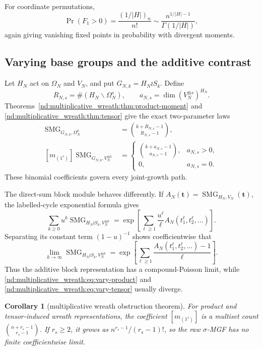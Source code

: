 \documentclass[10pt]{article}
\newcommand{\SMG}{\operatorname{SMG}}
\newcommand{\MGF}{\SMG}
\newtheorem{corollary}{Corollary}
\begin{document}
For coordinate permutations,
\[
 \Pr(F_1>0)=\frac{(1/|H|)_n}{n!}
 \sim\frac{n^{1/|H|-1}}{\Gamma(1/|H|)},
\]
again giving vanishing fixed points in probability with divergent moments.

\subsection{Varying base groups and the additive contrast}

Let $H_N$ act on $\Omega_N$ and $V_N$, and put
$G_{N,k}=H_N\wr S_k$.  Define
\[
 R_{N,s}=\#(H_N\backslash\Omega_N^s),
 \qquad a_{N,s}=\dim(V_N^{\otimes s})^{H_N}.
\]
Theorems~\ref{nd:multiplicative_wreath:thm:product-moment} and \ref{nd:multiplicative_wreath:thm:tensor} give the exact
two-parameter laws
\begin{align}
 [m_{(1^s)}]\MGF_{G_{N,k},\Omega_N^k}
 &=\binom{k+R_{N,s}-1}{R_{N,s}-1},\label{nd:multiplicative_wreath:eq:vary-product}\\
 [m_{(1^s)}]\MGF_{G_{N,k},V_N^{\otimes k}}
 &=\begin{cases}
 \binom{k+a_{N,s}-1}{a_{N,s}-1},&a_{N,s}>0,\\
 0,&a_{N,s}=0.
 \end{cases}\label{nd:multiplicative_wreath:eq:vary-tensor}
\end{align}
These binomial coefficients govern every joint-growth path.

The direct-sum block module behaves differently.  If
$A_N(\mathbf t)=\MGF_{H_N,V_N}(\mathbf t)$, the labelled-cycle exponential
formula gives
\begin{equation}\label{nd:multiplicative_wreath:eq:block-series}
 \sum_{k\ge0}u^k\MGF_{H_N\wr S_k,V_N^{\oplus k}}
 =\exp\!\left[\sum_{\ell\ge1}\frac{u^\ell}{\ell}
 A_N(t_1^\ell,t_2^\ell,\ldots)\right].
\end{equation}
Separating its constant term $(1-u)^{-1}$ shows coefficientwise that
\begin{equation}\label{nd:multiplicative_wreath:eq:block-limit}
 \lim_{k\to\infty}\MGF_{H_N\wr S_k,V_N^{\oplus k}}
 =\exp\!\left[\sum_{\ell\ge1}\frac{
 A_N(t_1^\ell,t_2^\ell,\ldots)-1}{\ell}\right].
\end{equation}
Thus the additive block representation has a compound-Poisson limit, while
\eqref{nd:multiplicative_wreath:eq:vary-product} and \eqref{nd:multiplicative_wreath:eq:vary-tensor} usually diverge.

\begin{corollary}[multiplicative wreath obstruction theorem]
For product and tensor-induced wreath representations, the coefficient
$[m_{(1^s)}]$ is a multiset count
$\binom{n+r_s-1}{r_s-1}$.  If $r_s\ge2$, it grows as
$n^{r_s-1}/(r_s-1)!$, so the raw $\sigma$-MGF has no finite coefficientwise
limit.
\end{corollary}
\end{document}
